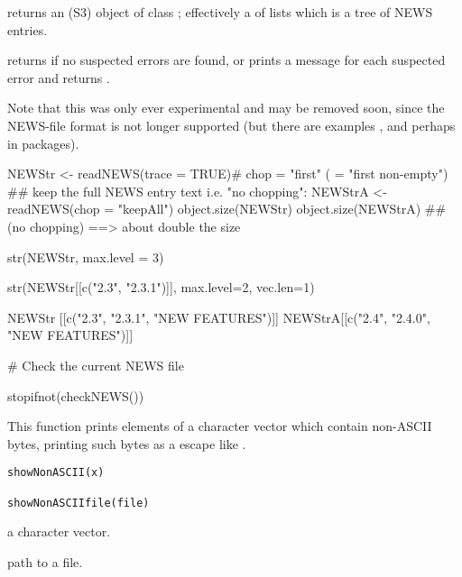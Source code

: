 %
\begin{Value}
 returns an (S3) object of class ;
effectively a  of lists which is a tree of NEWS
entries.

 returns  if no suspected errors are found,
or prints a message for each suspected error and returns .

Note that this was only ever experimental and may be removed soon,
since the NEWS-file format is not longer supported (but there are
examples ,  and perhaps in packages).
\end{Value}
%
\begin{Examples}
\begin{ExampleCode}

NEWStr  <- readNEWS(trace = TRUE)# chop = "first" ( = "first non-empty")
## keep the full NEWS entry text i.e. "no chopping":
NEWStrA <- readNEWS(chop = "keepAll")
object.size(NEWStr)
object.size(NEWStrA) ## (no chopping) ==> about double the size

str(NEWStr, max.level = 3)

str(NEWStr[[c("2.3", "2.3.1")]], max.level=2, vec.len=1)

NEWStr [[c("2.3", "2.3.1", "NEW FEATURES")]]
NEWStrA[[c("2.4", "2.4.0", "NEW FEATURES")]]

# Check the current NEWS file

stopifnot(checkNEWS())

\end{ExampleCode}
\end{Examples}
%
\begin{Description}\relax
This function prints elements of a character vector which contain
non-ASCII bytes, printing such bytes as a escape like .
\end{Description}
%
\begin{Usage}
\begin{verbatim}
showNonASCII(x)

showNonASCIIfile(file)
\end{verbatim}
\end{Usage}
%
\begin{Arguments}
\begin{ldescription}
\item[\code{x}] a character vector.
\item[\code{file}] path to a file.
\end{ldescription}
\end{Arguments}
